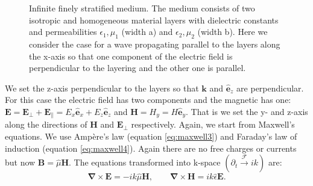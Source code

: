 \begin{figure}[h]
    \centering
    
    \caption{Infinite finely stratified medium. The medium consists of two isotropic and homogeneous material layers with dielectric constants and permeabilities $\epsilon_1, \mu_1$ (width a) and $\epsilon_2, \mu_2$ (width b). Here we consider the case for a wave propagating parallel to the layers along the x-axis so that one component of the electric field is perpendicular to the layering and the other one is parallel.}
    \label{fig:tikz_rytov_derivation}
\end{figure}

We set the z-axis perpendicular to the layers so that $\bm{k}$ and $\hat{\bm{e}}_z$ are perpendicular. For this case the electric field has two components and the magnetic has one: $\bm{E}=\bm{E_{\bot}} + \bm{E_{\parallel}} = E_x \hat{\bm{e}}_x + E_{z} \hat{\bm{e}}_z$ and $\bm{H}=H_y=H \hat{\bm{e}}_y$. That is we set the y- and z-axis along the directions of $\bm{H}$ and $\bm{E_{\bot}}$ respectively. Again, we start from Maxwell's equations. We use Ampère's law (equation \ref{eq:maxwell3}) and Faraday's law of induction (equation \ref{eq:maxwell4}). Again there are no free charges or currents but now $\bm{B} = \hat{\mu} \bm{H}$. The equations transformed into k-space $(\partial_t \xrightarrow{\mathscr{F}} ik)$ are:
\begin{equation}
    \label{eq:rytov_maxwell_initial}
    \bm{\nabla}\times\bm{E} =-ik \hat{\mu} \bm{H},
    \qquad
    \bm{\nabla}\times\bm{H} = ik \hat{\epsilon} \bm{E}.
\end{equation}

